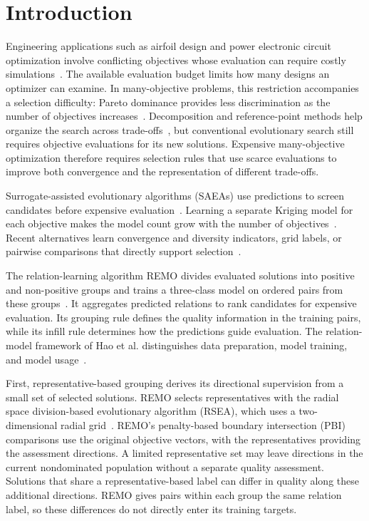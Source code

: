 \documentclass[final,5p,times,twocolumn]{elsarticle}
\begin{document}
\section{Introduction}
\label{sec:intro}

Engineering applications such as airfoil design and power electronic circuit
optimization involve conflicting objectives whose evaluation can require costly
simulations~\cite{ref:gcs_pso,ref:emmoea}. The available evaluation budget limits
how many designs an optimizer can examine. In many-objective problems, this
restriction accompanies a selection difficulty: Pareto dominance provides less
discrimination as the number of objectives increases~\cite{ref:maoea_survey}.
Decomposition and reference-point methods help organize the search across
trade-offs~\cite{ref:moead,ref:nsga3}, but conventional evolutionary search still
requires objective evaluations for its new solutions. Expensive many-objective
optimization therefore requires selection rules that use scarce evaluations to
improve both convergence and the representation of different trade-offs.

Surrogate-assisted evolutionary algorithms (SAEAs) use predictions to screen
candidates before expensive evaluation~\cite{ref:jin_saea,ref:saea_survey}.
Learning a separate Kriging model for each objective makes the model count
grow with the number of objectives~\cite{ref:krvea}. Recent alternatives learn
convergence and diversity indicators, grid labels, or pairwise comparisons
that directly support selection~\cite{ref:hesea,ref:gcs_pso,ref:pcsaea}.

The relation-learning algorithm REMO divides evaluated solutions into positive
and non-positive groups and trains a three-class model on ordered pairs from
these groups~\cite{ref:remo}. It aggregates predicted relations to rank
candidates for expensive evaluation. Its grouping rule defines the quality
information in the training pairs, while its infill rule determines how the
predictions guide evaluation. The relation-model framework of Hao et al. distinguishes data
preparation, model training, and model usage~\cite{ref:relation_framework}.

First, representative-based grouping derives its directional supervision from
a small set of selected solutions. REMO selects representatives with the radial
space division-based evolutionary algorithm (RSEA), which uses a two-dimensional
radial grid~\cite{ref:remo,ref:rsea}. REMO's penalty-based boundary intersection
(PBI) comparisons use the original objective vectors, with the representatives
providing the assessment directions. A limited representative set may leave
directions in the current nondominated population without a separate quality
assessment. Solutions that share a representative-based label can differ in
quality along these additional directions. REMO gives pairs within each group
the same relation label, so these differences do not directly enter its training
targets.
\end{document}
